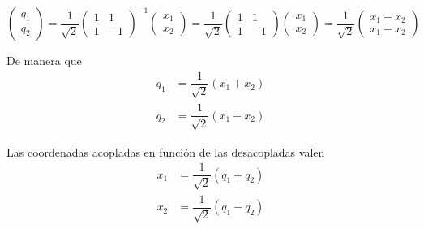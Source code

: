 \[
  \begin{pmatrix}q_1 \\ q_2 \end{pmatrix}
  =
  \dfrac{1}{\sqrt{2}}
  \begin{pmatrix}
    1 & 1\\
    1 & -1
  \end{pmatrix}^{-1}
  \begin{pmatrix}x_1 \\ x_2 \end{pmatrix}
    =
  \dfrac{1}{\sqrt{2}}
  \begin{pmatrix}
    1 & 1\\
    1 & -1
  \end{pmatrix}
  \begin{pmatrix}x_1 \\ x_2 \end{pmatrix}
  =
  \dfrac{1}{\sqrt{2}}
  \begin{pmatrix}
    x_1 + x_2 \\
    x_1 - x_2
  \end{pmatrix}
\]

De manera que
\begin{align*}
  q_1 &= \dfrac{1}{\sqrt{2}} (x_1 + x_2)\\
  q_2 &= \dfrac{1}{\sqrt{2}} (x_1 - x_2)
\end{align*}

Las coordenadas acopladas en función de las desacopladas valen
\begin{align*}
  x_1 &= \dfrac{1}{\sqrt{2}} (q_1 + q_2)\\
  x_2 &= \dfrac{1}{\sqrt{2}} (q_1 - q_2)
\end{align*}

